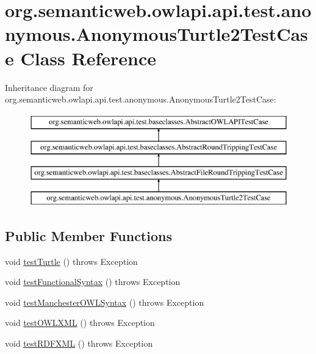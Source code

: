 \hypertarget{classorg_1_1semanticweb_1_1owlapi_1_1api_1_1test_1_1anonymous_1_1_anonymous_turtle2_test_case}{\section{org.\-semanticweb.\-owlapi.\-api.\-test.\-anonymous.\-Anonymous\-Turtle2\-Test\-Case Class Reference}
\label{classorg_1_1semanticweb_1_1owlapi_1_1api_1_1test_1_1anonymous_1_1_anonymous_turtle2_test_case}
}
Inheritance diagram for org.\-semanticweb.\-owlapi.\-api.\-test.\-anonymous.\-Anonymous\-Turtle2\-Test\-Case\-:\begin{figure}[H]
\begin{center}
\leavevmode
\includegraphics[height=4.000000cm]{classorg_1_1semanticweb_1_1owlapi_1_1api_1_1test_1_1anonymous_1_1_anonymous_turtle2_test_case}
\end{center}
\end{figure}
\subsection*{Public Member Functions}
\begin{DoxyCompactItemize}
\item 
void \hyperlink{classorg_1_1semanticweb_1_1owlapi_1_1api_1_1test_1_1anonymous_1_1_anonymous_turtle2_test_case_a8827a81e58e8fd1869c2ef8842edf9ac}{test\-Turtle} ()  throws Exception 
\item 
void \hyperlink{classorg_1_1semanticweb_1_1owlapi_1_1api_1_1test_1_1anonymous_1_1_anonymous_turtle2_test_case_a39a562d4d74ac6d4f8ffad9aefda9224}{test\-Functional\-Syntax} ()  throws Exception 
\item 
void \hyperlink{classorg_1_1semanticweb_1_1owlapi_1_1api_1_1test_1_1anonymous_1_1_anonymous_turtle2_test_case_a21e9464bae3270f1d208a4d50f8155f0}{test\-Manchester\-O\-W\-L\-Syntax} ()  throws Exception 
\item 
void \hyperlink{classorg_1_1semanticweb_1_1owlapi_1_1api_1_1test_1_1anonymous_1_1_anonymous_turtle2_test_case_a292a571d098bd0639bb12327d1b7365e}{test\-O\-W\-L\-X\-M\-L} ()  throws Exception 
\item 
void \hyperlink{classorg_1_1semanticweb_1_1owlapi_1_1api_1_1test_1_1anonymous_1_1_anonymous_turtle2_test_case_a85dd751731ffdf0936f2640057a56937}{test\-R\-D\-F\-X\-M\-L} ()  throws Exception 
\end{DoxyCompactItemize}
